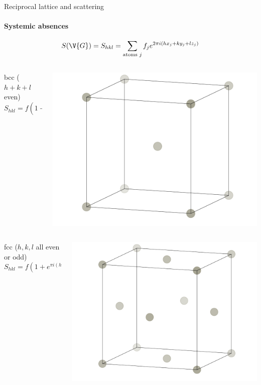 \documentclass{beamer}
\begin{document}
\begin{frame}{Reciprocal lattice and scattering}
\framesubtitle{Systemic absences}
\pause
\begin{equation*}
	S(\V{G}) = S_{hkl} = \sum_{\text{atoms } j} f_j e^{2\pi i(hx_j + ky_j + lz_j)}
\end{equation*}
\pause
\begin{columns}
	\begin{column}{0.7\textwidth}
		bcc ($ h+k+l $ even)
		\begin{equation*}
			S_{hkl} = f (1+ (-1)^{h+k+l})
		\end{equation*}
	\end{column}
	\begin{column}{0.25\textwidth}
		\includegraphics[width=\linewidth]{figures/bcc.pdf}
	\end{column}
\end{columns}
\pause
\begin{columns}
	\begin{column}{0.7\textwidth}
		fcc ($ h,k,l $ all even or odd)
		\begin{equation*}
		S_{hkl} = f (1+ e^{\pi i(h+k)} + e^{\pi i(k+l)} + e^{\pi i(h+l)})
		\end{equation*}
	\end{column}
	\begin{column}{0.25\textwidth}
		\includegraphics[width=\linewidth]{figures/fcc.pdf}

\end{column}
\end{columns}
\end{frame}
\end{document}
